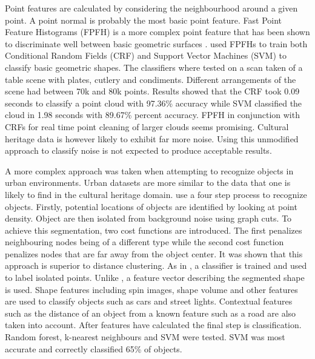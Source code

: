 \documentclass[10pt,twocolumn]{article}
\begin{document}
Point features are calculated by considering the neighbourhood around a given point. A point normal is probably the most basic point feature. Fast Point Feature Histograms (FPFH) is a more complex point feature that has been shown to discriminate well between basic geometric surfaces \cite{Rusu2009}. \citeauthor{Rusu2009} used FPFHs to train both Conditional Random Fields (CRF) and Support Vector Machines (SVM) to classify basic geometric shapes. The classifiers where tested on a scan taken of a table scene with plates, cutlery and condiments. Different arrangements of the scene had between 70k and 80k points. Results showed that the CRF took 0.09 seconds to classify a point cloud with 97.36\% accuracy while SVM classified the cloud in 1.98 seconds with 89.67\% percent accuracy. FPFH in conjunction with CRFs for real time point cleaning of larger clouds seems promising. Cultural heritage data is however likely to exhibit far more noise. Using this unmodified approach to classify noise is not expected to produce acceptable results.

A more complex approach was taken when attempting to recognize objects in urban environments. Urban datasets are more similar to the data that one is likely to find in the cultural heritage domain. \citeauthor{Golovinskiy2009} use a four step process to recognize objects. Firstly, potential locations of objects are identified by looking at point density. Object are then isolated from background noise using graph cuts. To achieve this segmentation, two cost functions are introduced. The first penalizes neighbouring nodes being of a different type while the second cost function penalizes nodes that are far away from the object center. It was shown that this approach is superior to distance clustering. As in \cite{Rusu2009}, a classifier is trained and used to label isolated points. Unlike \cite{Rusu2009}, a feature vector describing the segmented shape is used. Shape features including spin images, shape volume and other features are used to classify objects such as cars and street lights. Contextual features such as the distance of an object from a known feature such as a road are also taken into account. After features have calculated the final step is classification. Random forest, k-nearest neighbours and SVM were tested. SVM was most accurate and correctly classified 65\% of objects.

\end{document}

